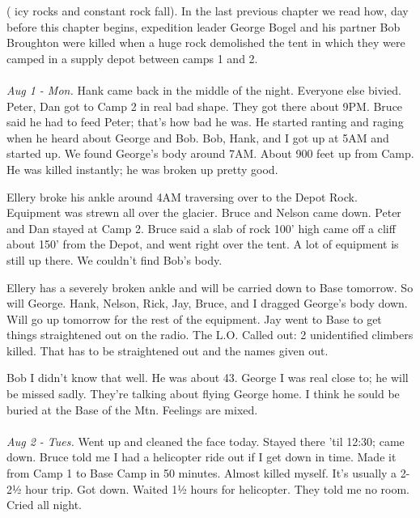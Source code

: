 \documentclass[10pt,a4paper]{article}
\begin{document}
\begin{multicols}{2}
 ( icy rocks and constant rock fall). In the last previous chapter we read how, day before this chapter begins, expedition leader George Bogel and his partner Bob Broughton were killed when a huge rock demolished the tent in which they were camped in a supply depot between camps 1 and 2.
\\
\\
\textit{Aug 1 - Mon.}
Hank came back in the middle of the night.  Everyone else bivied.  Peter, Dan got to Camp 2 in real bad shape.  They got there about 9PM.  Bruce said he had to feed Peter; that's how bad he was.  He started ranting and raging when he heard about George and Bob.  Bob, Hank, and I got up at 5AM and started up.  We found George's body around 7AM. About 900 feet up from Camp. He was killed instantly; he was broken up pretty good.

Ellery broke his ankle around 4AM traversing over to the Depot Rock.  Equipment was strewn all over the glacier.  Bruce and Nelson came down.  Peter and Dan stayed at Camp 2.  Bruce said a slab of rock 100' high came off a cliff about 150' from the Depot, and went right over the tent.  A lot of equipment is still up there.  We couldn't find Bob's body.  

Ellery has a severely broken ankle and will be carried down to Base tomorrow.  So will George.  Hank, Nelson, Rick, Jay, Bruce, and I dragged George's body down.  Will go up tomorrow for the rest of the equipment.  Jay went to Base to get things straightened out on the radio.  The L.O. Called out: 2 unidentified climbers killed.  That has to be straightened out and the names given out.

Bob I didn't know that well.  He was about 43.  George I was real close to; he will be missed sadly.  They're talking about flying George home.  I think he sould be buried at the Base of the Mtn.  Feelings are mixed.
\\
\\
\textit{Aug 2 - Tues.}
Went up and cleaned the face today.  Stayed there 'til 12:30; came down.  Bruce told me I had a helicopter ride out if I get down in time.  Made it from Camp 1 to Base Camp in 50 minutes. Almost killed myself.  It's usually a 2-2½ hour trip.  Got down.  Waited 1½ hours for helicopter.    They told me no room.  Cried all night. 


\end{multicols}
\end{document}
